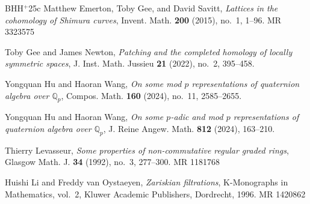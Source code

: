 \documentclass{article}
\numberwithin{equation}{section}
\newcommand{\bQ}{\mathbb{Q}}
\begin{document}
\begin{thebibliography}{BHH$^+$25c}
Matthew Emerton, Toby Gee, and David Savitt,
\textit{Lattices in the cohomology of Shimura curves},
Invent. Math. \textbf{200} (2015), no.~1, 1--96. MR 3323575

Toby Gee and James Newton,
\textit{Patching and the completed homology of locally symmetric spaces},
J. Inst. Math. Jussieu \textbf{21} (2022), no.~2, 395--458.

Yongquan Hu and Haoran Wang,
\textit{On some mod $p$ representations of quaternion algebra over $\bQ_p$},
Compos. Math. \textbf{160} (2024), no.~11, 2585--2655.

Yongquan Hu and Haoran Wang,
\textit{On some $p$-adic and mod $p$ representations of quaternion algebra over $\bQ_p$},
J. Reine Angew. Math. \textbf{812} (2024), 163--210.

Thierry Levasseur,
\textit{Some properties of non-commutative regular graded rings},
Glasgow Math. J. \textbf{34} (1992), no.~3, 277--300. MR 1181768

Huishi Li and Freddy van Oystaeyen,
\textit{Zariskian filtrations},
K-Monographs in Mathematics, vol.~2,
Kluwer Academic Publishers, Dordrecht, 1996. MR 1420862

\end{thebibliography}
\end{document}
